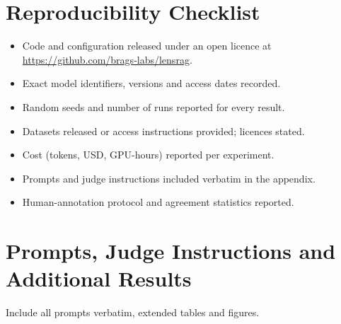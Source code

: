 \documentclass[11pt,letterpaper,oneside]{report}
\newcommand{\RepoURL}{https://github.com/brags-labs/lensrag}
\begin{document}
\chapter{Reproducibility Checklist}
\begin{itemize}[label=$\square$]
  \item Code and configuration released under an open licence at \url{\RepoURL}.
  \item Exact model identifiers, versions and access dates recorded.
  \item Random seeds and number of runs reported for every result.
  \item Datasets released or access instructions provided; licences stated.
  \item Cost (tokens, USD, GPU-hours) reported per experiment.
  \item Prompts and judge instructions included verbatim in the appendix.
  \item Human-annotation protocol and agreement statistics reported.
\end{itemize}

\chapter{Prompts, Judge Instructions and Additional Results}
Include all prompts verbatim, extended tables and figures.
\end{document}
